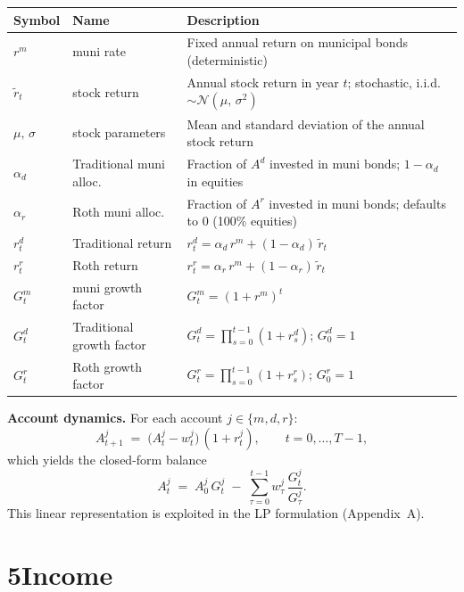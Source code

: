 \documentclass[12pt]{article}
\begin{document}
\begin{tabular}{@{} L{2.6cm} L{4.4cm} L{6.5cm} @{}}
\toprule
\textbf{Symbol} & \textbf{Name} & \textbf{Description} \\
\midrule
$r^m$ & muni rate & Fixed annual return on municipal bonds (deterministic) \\[3pt]
$\tilde{r}_t$ & stock return & Annual stock return in year $t$;
               stochastic, i.i.d.\ $\sim \mathcal{N}(\mu,\,\sigma^2)$ \\[3pt]
$\mu,\,\sigma$ & stock parameters & Mean and standard deviation of the annual stock return \\[3pt]
$\alpha_d$ & Traditional muni alloc.\ & Fraction of $A^d$ invested in muni bonds;
             $1-\alpha_d$ in equities \\[3pt]
$\alpha_r$ & Roth muni alloc.\ & Fraction of $A^r$ invested in muni bonds;
             defaults to 0 (100\% equities) \\[3pt]
$r^d_t$ & Traditional return & $r^d_t = \alpha_d\,r^m + (1-\alpha_d)\,\tilde{r}_t$ \\[3pt]
$r^r_t$ & Roth return & $r^r_t = \alpha_r\,r^m + (1-\alpha_r)\,\tilde{r}_t$ \\[3pt]
$G^m_t$ & muni growth factor & $G^m_t = (1+r^m)^t$ \\[3pt]
$G^d_t$ & Traditional growth factor & $G^d_t = \prod_{s=0}^{t-1}(1+r^d_s)$; \quad $G^d_0 = 1$ \\[3pt]
$G^r_t$ & Roth growth factor & $G^r_t = \prod_{s=0}^{t-1}(1+r^r_s)$; \quad $G^r_0 = 1$ \\
\bottomrule
\end{tabular}

\medskip\noindent
\textbf{Account dynamics.}  For each account $j \in \{m, d, r\}$:
\[
  A^j_{t+1} \;=\; \bigl(A^j_t - w^j_t\bigr)\,(1 + r^j_t),
  \qquad t = 0, \ldots, T-1,
\]
which yields the closed-form balance
\[
  A^j_t \;=\; A^j_0\,G^j_t \;-\; \sum_{\tau=0}^{t-1} w^j_\tau\,\frac{G^j_t}{G^j_\tau}.
\]
This linear representation is exploited in the LP formulation (Appendix~A).

\section*{5\quad Income}
\end{document}
